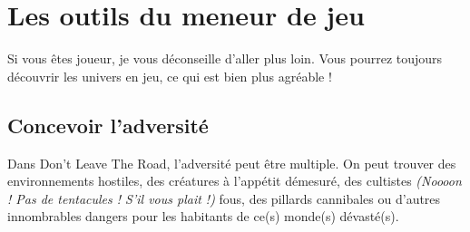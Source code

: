 \chapter{Les outils du meneur de jeu}
\newpage

Si vous êtes joueur, je vous déconseille d'aller plus loin. Vous pourrez toujours découvrir les univers en jeu, ce qui est bien plus agréable !

\section{Concevoir l'adversité}

Dans Don't Leave The Road, l'adversité peut être multiple. On peut trouver des environnements hostiles, des créatures à l'appétit démesuré, des cultistes \emph{(Noooon ! Pas de tentacules ! S'il vous plait !)} fous, des pillards cannibales ou d'autres innombrables dangers pour les habitants de ce(s) monde(s) dévasté(s).
